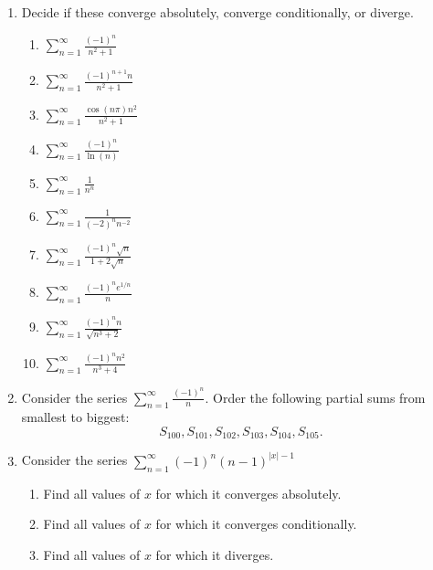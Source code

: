 \documentclass[11pt]{article}
\begin{document}
\begin{enumerate}

  \item Decide if these converge absolutely, converge conditionally, or diverge.
  \begin{enumerate}

    \item $\displaystyle \sum_{n=1}^\infty
    \frac{(-1)^n}{n^2+1}$

    \item $\displaystyle \sum_{n=1}^\infty
    \frac{(-1)^{n+1}n}{n^2+1}$

    \item $\displaystyle \sum_{n=1}^\infty
    \frac{\cos(n\pi)n^2}{n^2+1}$

    \item $\displaystyle \sum_{n=1}^\infty
    \frac{(-1)^n}{\ln(n)}$

    \item $\displaystyle \sum_{n=1}^\infty
    \frac{1}{n^n}$

    \item $\displaystyle \sum_{n=1}^\infty
    \frac{1}{(-2)^nn^{-2}}$

    \item $\displaystyle \sum_{n=1}^\infty
    \frac{(-1)^n\sqrt n}{1+2\sqrt n}$

    \item $\displaystyle \sum_{n=1}^\infty
    \frac{(-1)^ne^{1/n}}{n}$

    \item $\displaystyle \sum_{n=1}^\infty
    \frac{(-1)^nn}{\sqrt{n^3+2}}$

    \item $\displaystyle \sum_{n=1}^\infty
    \frac{(-1)^nn^2}{n^3+4}$

  \end{enumerate}

  \item Consider the series $\displaystyle \sum_{n=1}^\infty \frac{(-1)^n}{n}$.
  Order the following partial sums from smallest to biggest: \[
    S_{100}, S_{101}, S_{102},
    S_{103}, S_{104}, S_{105}.
  \]

  \item Consider the series $\displaystyle \sum_{n=1}^\infty (-1)^n(n-1)^{|x|-1}$
  \begin{enumerate}
    \item Find all values of $x$ for which it converges absolutely.
    \item Find all values of $x$ for which it converges conditionally.
    \item Find all values of $x$ for which it diverges.
  \end{enumerate}


\end{enumerate}
\end{document}
